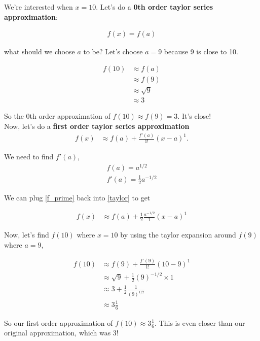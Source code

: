 \documentclass{article}
\begin{document}
We're interested when $x = 10$. Let's do a \textbf{0th order taylor series approximation}: 

\begin{align}
    f(x) = f(a)
\end{align}

what should we choose $a$ to be? Let's choose $a = 9$ because 9 is close to 10. 

\begin{align}
    f(10) & \approx f(a) \\
    & \approx f(9)\\
    & \approx \sqrt{9}\\
    & \approx 3
\end{align}

So the 0th order approximation of $f(10) \approx f(9) = 3$. It's close! \\

Now, let's do a \textbf{first order taylor series approximation} 
\begin{align}
    f(x) &\approx f(a) + \frac{f'(a)}{1!}(x-a)^1. \label{taylor}
\end{align}

We need to find $f'(a)$,
\begin{align}
    f(a) = a^{1/2}\\
    f'(a) = \frac{1}{2} a^{-1/2} \label{f_prime}
\end{align}

We can plug \ref{f_prime} back into \ref{taylor} to get 

\begin{align}
    f(x) &\approx f(a) + \frac{1}{2} \frac{a^{-1/2}}{1} (x - a)^1
\end{align}

Now, let's find $f(10)$ where $x = 10$ by using the taylor expansion around $f(9)$ where $a = 9$,

\begin{align}
    f(10) &\approx f(9) +  \frac{f'(9)}{1!}(10-9)^1\\
    &\approx \sqrt{9} + \frac{1}{2}(9)^{-1/2}\times1\\
    &\approx 3 + \frac{1}{2}\frac{1}{(9)^{1/2}}\\
    &\approx 3 \frac{1}{6}
\end{align}

So our first order approximation of $f(10) \approx 3 \frac{1}{6}$. This is even closer than our original approximation, which was 3!\\
\end{document}
